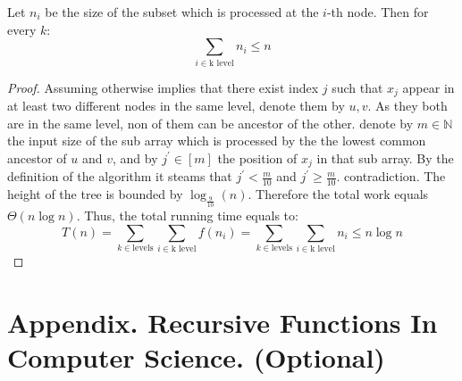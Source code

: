 \begin{example}
\begin{claim}
Let \(n_i\) be the size of the subset which is processed at the \(i\)-th node. Then for every \(k\):
\begin{equation*}
    \sum_{i \in \text{k level}}{n_i} \le n
\end{equation*}
\end{claim}
\begin{proof} Assuming otherwise implies that there exist index \(j\) such that \(x_j\) appear in at least two different nodes in the same level, denote them by \(u,v\). As they both are in the same level, non of them can be ancestor of the other. denote by \(m \in \mathbb{N}\) the input size of the sub array which is processed by the the lowest common ancestor of \(u\) and \(v\), and by \(j^\prime \in [m]\) the position of \(x_j\) in that sub array. By the definition of the algorithm it steams that \(j^\prime < \frac{m}{10} \) and \(j^\prime \ge \frac{m}{10}\). contradiction.  The height of the tree is bounded by \( \log_{\frac{9}{10}} \left(n\right) \). Therefore the total work equals \( \Theta \left( n\log n \right) \). Thus, the total running time equals to:
\begin{equation*}
    T(n) = \sum_{k \in \text{levels}}{\sum_{i \in \text{k level}}{f\left(n_i\right)}} = \sum_{k \in \text{levels}}{\sum_{i \in \text{k level}}{n_i}} \le n\log n  
\end{equation*}
\end{proof}
\end{example}
\section{Appendix. Recursive Functions In Computer Science. (Optional)}



